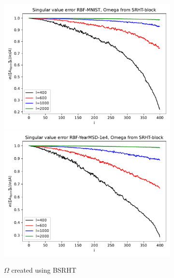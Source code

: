 \documentclass{article}
\theoremstyle{definition}
\begin{document}
\begin{figure}
\centering
\hfill\begin{subfigure}[t]{\textwidth+20pt\relax}
    \includegraphics[width=\dimexpr\linewidth-20pt\relax]{plots/singular_values/singular_values_RBF-MNIST_SRHT-block.pdf}
    \includegraphics[width=\dimexpr\linewidth-20pt\relax]{plots/singular_values/singular_values_RBF-YearMSD-1e4_SRHT-block.pdf}
    \caption{$\Omega$ created using BSRHT}
\end{subfigure}\hfill
\begin{subfigure}[t]{0.4\textwidth}

\end{subfigure}
\end{figure}
\end{document}
